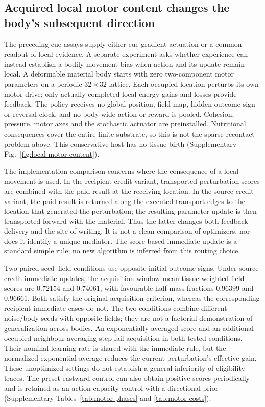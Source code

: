 \subsection*{Acquired local motor content changes the body's subsequent direction}

The preceding cue assays supply either cue-gradient actuation or a common readout of local evidence. A separate experiment asks whether experience can instead establish a bodily movement bias when action and its update remain local. A deformable material body starts with zero two-component motor parameters on a periodic $32\times32$ lattice. Each occupied location perturbs its own motor drive; only actually completed local energy gains and losses provide feedback. The policy receives no global position, field map, hidden outcome sign or reversal clock, and no body-wide action or reward is pooled. Cohesion, pressure, motor axes and the stochastic actuator are preinstalled. Nutritional consequences cover the entire finite substrate, so this is not the sparse recontact problem above. This conservative host has no tissue birth (Supplementary Fig.~\ref{fig:local-motor-content}).

The implementation comparison concerns where the consequence of a local movement is used. In the recipient-credit variant, transported perturbation scores are combined with the paid result at the receiving location. In the source-credit variant, the paid result is returned along the executed transport edges to the location that generated the perturbation; the resulting parameter update is then transported forward with the material. Thus the latter changes both feedback delivery and the site of writing. It is not a clean comparison of optimizers, nor does it identify a unique mediator. The score-based immediate update is a standard simple rule; no new algorithm is inferred from this routing choice.

Two paired seed--field conditions use opposite initial outcome signs. Under source-credit immediate updates, the acquisition-window mean tissue-weighted field scores are $0.72154$ and $0.74061$, with favourable-half mass fractions $0.96399$ and $0.96661$. Both satisfy the original acquisition criterion, whereas the corresponding recipient-immediate cases do not. The two conditions combine different noise/body seeds with opposite fields; they are not a factorial demonstration of generalization across bodies. An exponentially averaged score and an additional occupied-neighbour averaging step fail acquisition in both tested conditions. Their nominal learning rate is shared with the immediate rule, but the normalized exponential average reduces the current perturbation's effective gain. These unoptimized settings do not establish a general inferiority of eligibility traces. The preset eastward control can also obtain positive scores periodically and is retained as an action-capacity control with a directional prior (Supplementary Tables~\ref{tab:motor-phases} and \ref{tab:motor-costs}).

